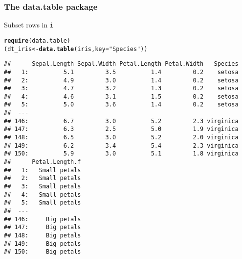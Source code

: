 \documentclass[paper=screen,mathserif]{beamer}\usepackage[]{graphicx}\usepackage[]{color}
\makeatletter
\newcommand{\hlstr}[1]{\textcolor[rgb]{0.192,0.494,0.8}{#1}}%
\newcommand{\hlstd}[1]{\textcolor[rgb]{0.345,0.345,0.345}{#1}}%
\newcommand{\hlkwb}[1]{\textcolor[rgb]{0.69,0.353,0.396}{#1}}%
\newcommand{\hlkwc}[1]{\textcolor[rgb]{0.333,0.667,0.333}{#1}}%
\newcommand{\hlkwd}[1]{\textcolor[rgb]{0.737,0.353,0.396}{\textbf{#1}}}%
\newenvironment{kframe}{%
 \def\at@end@of@kframe{}%
 \ifinner\ifhmode%
  \def\at@end@of@kframe{\end{minipage}}%
  \begin{minipage}{\columnwidth}%
 \fi\fi%
 \def\FrameCommand##1{\hskip\@totalleftmargin \hskip-\fboxsep
 \colorbox{shadecolor}{##1}\hskip-\fboxsep
     \hskip-\linewidth \hskip-\@totalleftmargin \hskip\columnwidth}%
 \MakeFramed {\advance\hsize-\width
   \@totalleftmargin\z@ \linewidth\hsize
   \@setminipage}}%
 {\par\unskip\endMakeFramed%
 \at@end@of@kframe}
\newenvironment{knitrout}{}{} %
\newcommand{\ft}[1]{\frametitle{#1}}
\makeatother
\begin{document}
\begin{frame}[fragile]
  \ft{The {\bf data.table} package}
  
  Subset rows in {\tt i}
\begin{knitrout}\scriptsize
{}\color{fgcolor}\begin{kframe}
\begin{alltt}
\hlkwd{require}\hlstd{(data.table)}
\hlstd{(dt_iris} \hlkwb{<-} \hlkwd{data.table}\hlstd{(iris,} \hlkwc{key} \hlstd{=} \hlstr{"Species"}\hlstd{))}
\end{alltt}
\begin{verbatim}
##      Sepal.Length Sepal.Width Petal.Length Petal.Width   Species
##   1:          5.1         3.5          1.4         0.2    setosa
##   2:          4.9         3.0          1.4         0.2    setosa
##   3:          4.7         3.2          1.3         0.2    setosa
##   4:          4.6         3.1          1.5         0.2    setosa
##   5:          5.0         3.6          1.4         0.2    setosa
##  ---                                                            
## 146:          6.7         3.0          5.2         2.3 virginica
## 147:          6.3         2.5          5.0         1.9 virginica
## 148:          6.5         3.0          5.2         2.0 virginica
## 149:          6.2         3.4          5.4         2.3 virginica
## 150:          5.9         3.0          5.1         1.8 virginica
##      Petal.Length.f
##   1:   Small petals
##   2:   Small petals
##   3:   Small petals
##   4:   Small petals
##   5:   Small petals
##  ---               
## 146:     Big petals
## 147:     Big petals
## 148:     Big petals
## 149:     Big petals
## 150:     Big petals
\end{verbatim}
\end{kframe}
\end{knitrout}

\end{frame}
\end{document}
